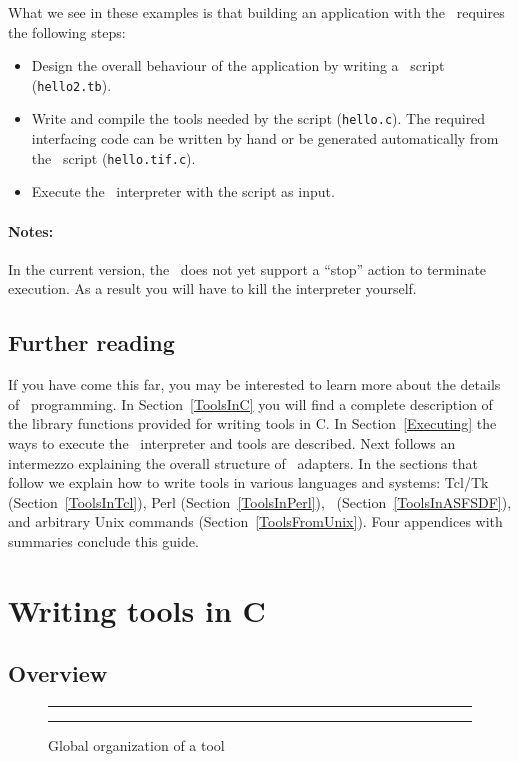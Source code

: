 What we see in these examples is that
building an application with the \TB\ requires the following steps:
\begin{itemize}
\item Design the overall behaviour of the application by writing a \T\ script ({\tt hello2.tb}).
\item Write and compile the tools needed by the script ({\tt hello.c}).
The required interfacing code can be written by hand or be generated
automatically from the \T\ script ({\tt hello.tif.c}).
\item Execute the \TB\ interpreter with the script as input.
\end{itemize}

\paragraph{Notes:}

In the current version, the \TB\ does not yet support a ``stop'' action
to terminate execution. As a result you will have to kill the interpreter yourself.

\subsection{Further reading}
If you have come this far, you may be interested to learn more about the details
of \TB\ programming.
In Section~\ref{ToolsInC} you will find a complete description
of the library functions provided for writing tools in C.
In Section~\ref{Executing} the ways to execute the \TB\ interpreter
and tools are described.
Next follows an intermezzo explaining the overall structure of \TB\ adapters.
In the sections that follow we explain how to write tools in various languages
and systems: Tcl/Tk (Section~\ref{ToolsInTcl}),
Perl (Section~\ref{ToolsInPerl}),
\ASFSDF\ (Section~\ref{ToolsInASFSDF}), 
and arbitrary Unix commands (Section~\ref{ToolsFromUnix}).
Four appendices with summaries conclude this guide.

\section{\label{ToolsInC}Writing tools in C}

\subsection{Overview}

\begin{figure}[tb]
\rule{\textwidth}{0.5mm}
  
  \centerline{\box\graph}
  \caption{Global organization of a tool}
  \label{fig:Tool}
\rule{\textwidth}{0.5mm}
\end{figure}


